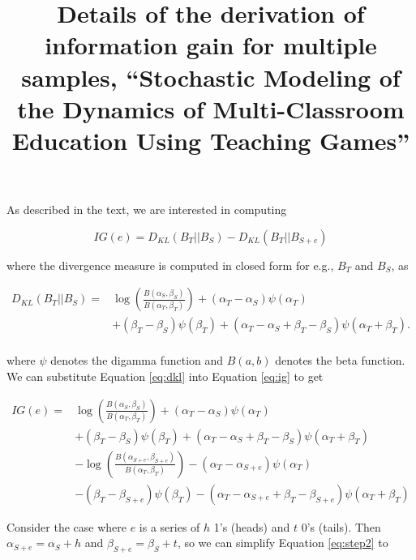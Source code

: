 \documentclass[12pt]{article}
\title{Details of the derivation of information gain for multiple samples, ``Stochastic Modeling of the Dynamics of Multi-Classroom Education Using Teaching Games''}
\date{}
\begin{document}
\maketitle

As described in the text, we are interested in computing

\begin{equation}
\label{eq:ig}
IG(e) = D_{KL} ( B_T || B_{S} )  - D_{KL} (B_T ||B_{S+e} ) 
\end{equation}

\noindent where the divergence measure is computed in closed form for e.g., $B_T$ and $B_S$, as

\begin{equation}
\label{eq:dkl}
\begin{split}
D_{KL} (B_T ||B_{S} )  = & \log( \frac{B(\alpha_{S},\beta_{S})}{B(\alpha_{T},\beta_{T})}) +  (\alpha_T - \alpha_S) \psi (\alpha_T) \\ 
& + (\beta_T - \beta_S) \psi (\beta_T) +  (\alpha_T - \alpha_S + \beta_T - \beta_S) \psi (\alpha_T + \beta_T). \\
\end{split}
\end{equation}

\noindent where $\psi$ denotes the digamma function and $B(a,b)$ denotes the beta function. We can substitute Equation \ref{eq:dkl} into Equation \ref{eq:ig} to get

\begin{equation}
\begin{split}
IG(e)  = & \log( \frac{B(\alpha_{S},\beta_{S})}{B(\alpha_{T},\beta_{T})}) + (\alpha_T - \alpha_S) \psi (\alpha_T)  \\ 
& + (\beta_T - \beta_S) \psi (\beta_T) +  (\alpha_T - \alpha_S + \beta_T - \beta_S) \psi (\alpha_T + \beta_T)  \\
& - \log( \frac{B(\alpha_{S+e},\beta_{S+e})}{B(\alpha_{T},\beta_{T})}) - (\alpha_T - \alpha_{S+e}) \psi (\alpha_T) \\ 
& - (\beta_T - \beta_{S+e}) \psi (\beta_T) - (\alpha_T - \alpha_{S+e} + \beta_T - \beta_{S+e}) \psi (\alpha_T + \beta_T)
\end{split}
\label{eq:step2}
\end{equation}

Consider the case where $e$ is a series of $h$ 1's (heads) and $t$ 0's (tails). Then $\alpha_{S+e}= \alpha_S + h$ and $\beta_{S+e}= \beta_{S} + t$, so we can simplify Equation \ref{eq:step2} to
\end{document}
